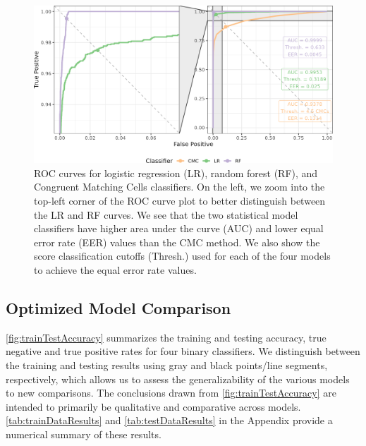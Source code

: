 \documentclass[reprint]{JASA}
\begin{document}
\begin{figure}[htbp]

{\centering \includegraphics[width=\textwidth]{images/resultsPlots/rocPlot} 

}

\caption{ROC curves for logistic regression (LR), random forest (RF), and Congruent Matching Cells classifiers. On the left, we zoom into the top-left corner of the ROC curve plot to better distinguish between the LR and RF curves. We see that the two statistical model classifiers have higher area under the curve (AUC) and lower equal error rate (EER) values than the CMC method. We also show the score classification cutoffs (Thresh.) used for each of the four models to achieve the equal error rate values.}\label{fig:rocPlot}
\end{figure}

\hypertarget{optimized-model-comparison}{%
\subsection{Optimized Model
Comparison}\label{optimized-model-comparison}}

\autoref{fig:trainTestAccuracy} summarizes the training and testing
accuracy, true negative and true positive rates for four binary
classifiers. We distinguish between the training and testing results
using gray and black points/line segments, respectively, which allows us
to assess the generalizability of the various models to new comparisons.
The conclusions drawn from \autoref{fig:trainTestAccuracy} are intended
to primarily be qualitative and comparative across models.
\autoref{tab:trainDataResults} and \autoref{tab:testDataResults} in the
Appendix provide a numerical summary of these results.
\end{document}
